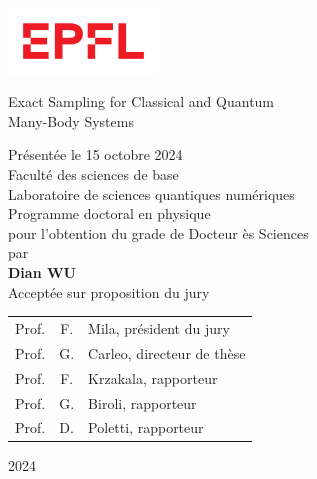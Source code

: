 
\begin{titlepage}
\begin{otherlanguage}{french}

\sffamily

\begin{flushleft}
\parbox{0.3\textwidth}{\includegraphics[width=4cm]{images/epfl}}
\end{flushleft}

\begin{flushright}
\phantom{Thèse n.~TODO}
\end{flushright}

\null\vspace{2cm}

\begin{minipage}{4cm}
\end{minipage}
\hfill
\begin{minipage}{11cm}
{\Large Exact Sampling for Classical and Quantum \\[8pt] Many-Body Systems} \\

\vspace{2cm}

\small
Présentée le 15 octobre 2024 \\[8pt]
Faculté des sciences de base \\
Laboratoire de sciences quantiques numériques \\
Programme doctoral en physique \\

pour l'obtention du grade de Docteur ès Sciences \\[8pt]
par \\ [12pt]
{\Large \textbf{Dian WU}} \\[9pt]

Acceptée sur proposition du jury \\[5pt]
\setlength{\tabcolsep}{1.5pt}
\begin{tabular}{@{}lcl}
Prof. & F. & Mila, président du jury \\
Prof. & G. & Carleo, directeur de thèse \\
Prof. & F. & Krzakala, rapporteur \\
Prof. & G. & Biroli, rapporteur \\
Prof. & D. & Poletti, rapporteur \\
\end{tabular}
\end{minipage}
\vspace{2.33cm}
\begin{flushright}
2024
\end{flushright}

\end{otherlanguage}
\end{titlepage}
